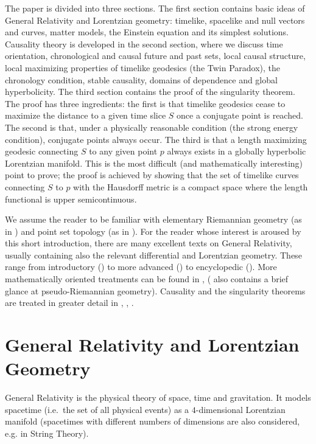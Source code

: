 \documentclass[10pt]{amsart}
\theoremstyle{definition}
\theoremstyle{remark}
\begin{document}
The paper is divided into three sections. The first section contains basic ideas of General Relativity and Lorentzian geometry: timelike, spacelike and null vectors and curves, matter models, the Einstein equation and its simplest solutions. Causality theory is developed in the second section, where we discuss time orientation, chronological and causal future and past sets, local causal structure, local maximizing properties of timelike geodesics (the Twin Paradox), the chronology condition, stable causality, domains of dependence and global hyperbolicity. The third section contains the proof of the singularity theorem. The proof has three ingredients: the first is that timelike geodesics cease to maximize the distance to a given time slice $S$ once a conjugate point is reached. The second is that, under a physically reasonable condition (the strong energy condition), conjugate points always occur. The third is that a length maximizing geodesic connecting $S$ to any given point $p$ always exists in a globally hyperbolic Lorentzian manifold. This is the most difficult (and mathematically interesting) point to prove; the proof is achieved by showing that the set of timelike curves connecting $S$ to $p$ with the Hausdorff metric is a compact space where the length functional is upper semicontinuous.

We assume the reader to be familiar with elementary Riemannian geometry (as in \cite{Carmo93}) and point set topology (as in \cite{Munkres00}). For the reader whose interest is aroused by this short introduction, there are many excellent texts on General Relativity, usually containing also the relevant differential and Lorentzian geometry. These range from introductory (\cite{Schutz02}) to more advanced (\cite{W84}) to encyclopedic (\cite{MTW73}). More mathematically oriented treatments can be found in \cite{BEE96}, \cite{ONeill83} (\cite{GHL04} also contains a brief glance at pseudo-Riemannian geometry). Causality and the singularity theorems are treated in greater detail in \cite{Penrose87}, \cite{HE95}, \cite{Naber88}.
%
%
%
\section{General Relativity and Lorentzian Geometry}
%
General Relativity is the physical theory of space, time and gravitation. It models spacetime (i.e.~the set of all physical events) as a $4$-dimensional Lorentzian manifold (spacetimes with different numbers of dimensions are also considered, e.g. in String Theory).
\end{document}
